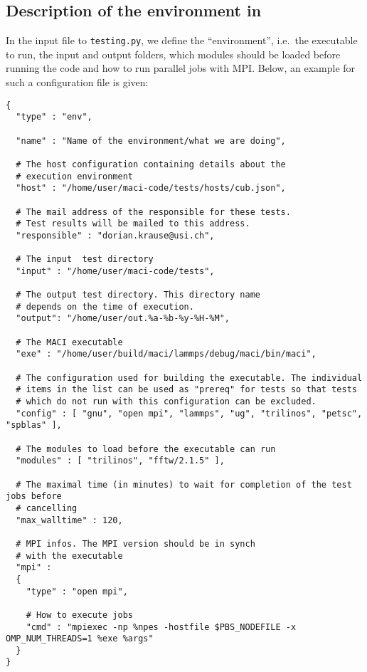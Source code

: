 \subsection{Description of the environment in \JSON}

In the input file to \lstinline[style=SHELL]|testing.py|, we define the ``environment'', i.e.~the executable to run, the input and output folders, which modules should be loaded before running the code and how to run parallel jobs with MPI. Below, an example for such a configuration file is given:

\begin{lstlisting}[style=SHELL_SMALL,frame=lines]
{
  "type" : "env",
  
  "name" : "Name of the environment/what we are doing",

  # The host configuration containing details about the
  # execution environment
  "host" : "/home/user/maci-code/tests/hosts/cub.json",

  # The mail address of the responsible for these tests.
  # Test results will be mailed to this address.
  "responsible" : "dorian.krause@usi.ch",

  # The input  test directory
  "input" : "/home/user/maci-code/tests",
	
  # The output test directory. This directory name
  # depends on the time of execution.
  "output": "/home/user/out.%a-%b-%y-%H-%M",

  # The MACI executable
  "exe" : "/home/user/build/maci/lammps/debug/maci/bin/maci",

  # The configuration used for building the executable. The individual
  # items in the list can be used as "prereq" for tests so that tests
  # which do not run with this configuration can be excluded.
  "config" : [ "gnu", "open mpi", "lammps", "ug", "trilinos", "petsc", "spblas" ],
	
  # The modules to load before the executable can run
  "modules" : [ "trilinos", "fftw/2.1.5" ],

  # The maximal time (in minutes) to wait for completion of the test jobs before
  # cancelling
  "max_walltime" : 120,

  # MPI infos. The MPI version should be in synch
  # with the executable
  "mpi" :
  {
    "type" : "open mpi",

    # How to execute jobs
    "cmd" : "mpiexec -np %npes -hostfile $PBS_NODEFILE -x OMP_NUM_THREADS=1 %exe %args"
  }
}
\end{lstlisting}


